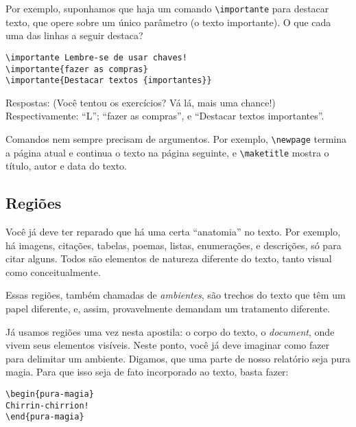 Por exemplo, suponhamos que haja um comando \verb!\importante! para
destacar texto, que opere sobre um único parâmetro (o texto
importante). O que cada uma das linhas a seguir destaca?

\begin{footnotesize}
\begin{verbatim}
\importante Lembre-se de usar chaves!
\importante{fazer as compras}
\importante{Destacar textos {importantes}}
\end{verbatim}
\end{footnotesize}

Respostas: (Você tentou os exercícios? Vá lá, mais uma chance!)
Respectivamente: ``L''; ``fazer as compras'', e ``Destacar textos {importantes}''.

Comandos nem sempre precisam de argumentos. Por exemplo,
\verb!\newpage! termina a página atual e continua o texto na página
seguinte, e \verb!\maketitle! mostra o título, autor e data do texto.

\subsection{Regiões}

Você já deve ter reparado que há uma certa ``anatomia'' no
texto. Por exemplo, há imagens, citações, tabelas, poemas, listas,
enumerações, e descrições, só para citar alguns. Todos são 
elementos de natureza diferente do texto, tanto visual como
conceitualmente.

Essas regiões, também chamadas de \emph{ambientes}, são trechos do
texto que têm um papel diferente, e, assim, provavelmente demandam um
tratamento diferente.

Já usamos regiões uma vez nesta apostila: o corpo do texto, o
\emph{document}, onde vivem seus elementos visíveis. Neste ponto, você
já deve imaginar como fazer para delimitar um ambiente. Digamos, que
uma parte de nosso relatório seja pura magia. Para que isso seja de
fato incorporado ao texto, basta fazer:

\begin{footnotesize}
\begin{verbatim}
\begin{pura-magia}
Chirrin-chirrion!
\end{pura-magia}
\end{verbatim}
\end{footnotesize}


